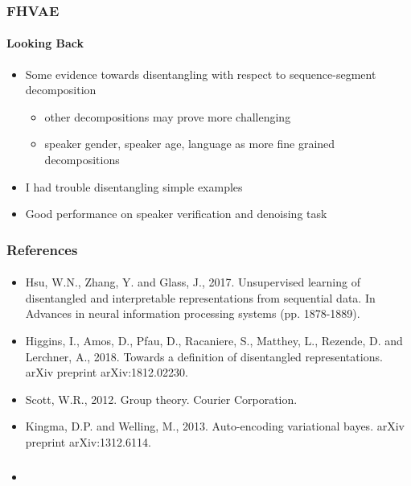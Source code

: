 \documentclass[9pt]{beamer}
\begin{document}
\begin{frame}
\frametitle{FHVAE}
\framesubtitle{Looking Back} %
\begin{itemize}
	\item Some evidence towards disentangling with respect to sequence-segment decomposition
	\begin{itemize}
		\item other decompositions may prove more challenging
		\item speaker gender, speaker age, language as more fine grained decompositions
	\end{itemize}
	\item I had trouble disentangling simple examples
	\item Good performance on speaker verification and denoising task
\end{itemize}
\end{frame} 


\begin{frame}
\frametitle{References}
\framesubtitle{}
\begin{itemize}
	\item Hsu, W.N., Zhang, Y. and Glass, J., 2017. Unsupervised learning of disentangled and interpretable representations from sequential data. In Advances in neural information processing systems (pp. 1878-1889).
	\item Higgins, I., Amos, D., Pfau, D., Racaniere, S., Matthey, L., Rezende, D. and Lerchner, A., 2018. Towards a definition of disentangled representations. arXiv preprint arXiv:1812.02230.
	\item Scott, W.R., 2012. Group theory. Courier Corporation.
	\item Kingma, D.P. and Welling, M., 2013. Auto-encoding variational bayes. arXiv preprint arXiv:1312.6114.
\end{itemize}
\end{frame} 




\begin{frame}
\frametitle{}
\framesubtitle{}
\begin{itemize}
	\item 
\end{itemize}
\end{frame} 
\end{document}
